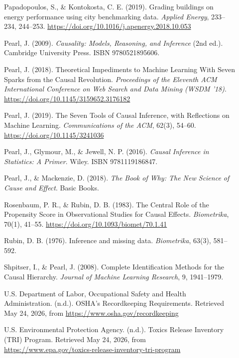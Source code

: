 \begin{description}
\item[] \hypertarget{papadopouloskontokosta2019}{}Papadopoulos, S., \& Kontokosta, C. E. (2019). Grading buildings on energy performance using city benchmarking data. \textit{Applied Energy}, 233--234, 244--253. \url{https://doi.org/10.1016/j.apenergy.2018.10.053}
\item[] \hypertarget{pearl2009}{}Pearl, J. (2009). \textit{Causality: Models, Reasoning, and Inference} (2nd ed.). Cambridge University Press. ISBN 9780521895606.
\item[] \hypertarget{pearl2018}{}Pearl, J. (2018). Theoretical Impediments to Machine Learning With Seven Sparks from the Causal Revolution. \textit{Proceedings of the Eleventh ACM International Conference on Web Search and Data Mining (WSDM '18)}. \url{https://doi.org/10.1145/3159652.3176182}
\item[] \hypertarget{pearl2019}{}Pearl, J. (2019). The Seven Tools of Causal Inference, with Reflections on Machine Learning. \textit{Communications of the ACM}, 62(3), 54--60. \url{https://doi.org/10.1145/3241036}
\item[] \hypertarget{pearletal2016}{}Pearl, J., Glymour, M., \& Jewell, N. P. (2016). \textit{Causal Inference in Statistics: A Primer}. Wiley. ISBN 9781119186847.
\item[] \hypertarget{pearlmackenzie2018}{}Pearl, J., \& Mackenzie, D. (2018). \textit{The Book of Why: The New Science of Cause and Effect}. Basic Books.
\item[] \hypertarget{rosenbaumrubin1983}{}Rosenbaum, P. R., \& Rubin, D. B. (1983). The Central Role of the Propensity Score in Observational Studies for Causal Effects. \textit{Biometrika}, 70(1), 41--55. \url{https://doi.org/10.1093/biomet/70.1.41}
\item[] \hypertarget{rubin1976}{}Rubin, D. B. (1976). Inference and missing data. \textit{Biometrika}, 63(3), 581--592.
\item[] \hypertarget{shpitserpearl2008}{}Shpitser, I., \& Pearl, J. (2008). Complete Identification Methods for the Causal Hierarchy. \textit{Journal of Machine Learning Research}, 9, 1941--1979.
\item[] \hypertarget{departmentnd}{}U.S. Department of Labor, Occupational Safety and Health Administration. (n.d.). OSHA's Recordkeeping Requirements. Retrieved May 24, 2026, from \url{https://www.osha.gov/recordkeeping}
\item[] \hypertarget{environmentalnd}{}U.S. Environmental Protection Agency. (n.d.). Toxics Release Inventory (TRI) Program. Retrieved May 24, 2026, from \url{https://www.epa.gov/toxics-release-inventory-tri-program}

\end{description}
